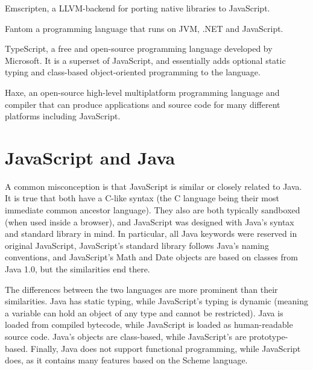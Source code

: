 \begin{compactitem}
\item Emscripten, a LLVM-backend for porting native libraries to JavaScript.
\item Fantom a programming language that runs on JVM, .NET and JavaScript.
\item TypeScript, a free and open-source programming language developed by Microsoft. It is a superset of JavaScript, and essentially adds optional static typing and class-based object-oriented programming to the language.
\item Haxe, an open-source high-level multiplatform programming language and compiler that can produce applications and source code for many different platforms including JavaScript.
\end{compactitem}

\section{JavaScript and Java}

A common misconception is that JavaScript is similar or closely related to Java. It is true that both have a C-like syntax (the C language being their most immediate common ancestor language). They also are both typically sandboxed (when used inside a browser), and JavaScript was designed with Java's syntax and standard library in mind. In particular, all Java keywords were reserved in original JavaScript, JavaScript's standard library follows Java's naming conventions, and JavaScript's Math and Date objects are based on classes from Java 1.0, but the similarities end there.

The differences between the two languages are more prominent than their similarities. Java has static typing, while JavaScript's typing is dynamic (meaning a variable can hold an object of any type and cannot be restricted). Java is loaded from compiled bytecode, while JavaScript is loaded as human-readable source code. Java's objects are class-based, while JavaScript's are prototype-based. Finally, Java does not support functional programming, while JavaScript does, as it contains many features based on the Scheme language.




\clearpage






















